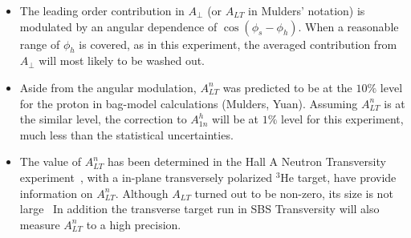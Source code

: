 \begin{itemize}
    \item  The leading order contribution in $A_{\perp}$ (or $A_{LT}$ in Mulders' notation)  
           is modulated by an angular dependence of $ \cos(\phi_s - \phi_h)$.
           When a reasonable range of $\phi_h$ is covered,  as in this experiment, 
           the averaged contribution from $A_{\perp}$ will most likely to be washed out.
 
    \item  Aside from the angular modulation, $A^n_{LT}$  was predicted to be at 
           the $10 \%$ level for the proton in bag-model calculations (Mulders, Yuan).
           Assuming $A^n_{LT}$ is at the similar level, the correction to $A_{1n}^h$
           will be at $1 \%$ level for this experiment, much less than the 
           statistical uncertainties.    
             
    \item  The value of $A^n_{LT}$ has been determined in the Hall A Neutron
           Transversity experiment~\cite{E06010_ALT_PRL}, with a in-plane transversely polarized $^3$He target, have provide
            information on $A^n_{LT}$.    Although $A_{LT}$ turned out to be non-zero,  its size is not large~\cite{E06010_ALT_PRL}
            In addition the transverse target run in SBS Transversity will also measure $A^n_{LT}$ to a high precision.
\end{itemize}  


